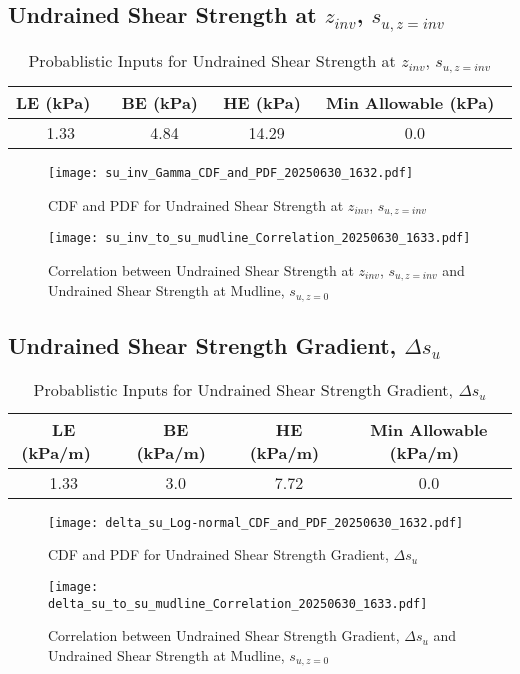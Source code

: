 \documentclass{article}
\begin{document}
\subsection*{Undrained Shear Strength at $z_{inv}$, $s_{{u,z=inv}}$}
\begin{table}[h!]
\centering
\caption{Probablistic Inputs for Undrained Shear Strength at $z_{inv}$, $s_{{u,z=inv}}$}
\begin{tabular}{|c|c|c|c|}
\hline
LE (kPa) \ & BE (kPa)\ & HE (kPa)\ & Min Allowable (kPa)\ \\
\hline
1.33 & 4.84 & 14.29 & 0.0 \\
\hline
\end{tabular}
\end{table}
\begin{figure}[h!]
\centering
\texttt{[image: su\_inv\_Gamma\_CDF\_and\_PDF\_20250630\_1632.pdf]}
\caption{CDF and PDF for Undrained Shear Strength at $z_{inv}$, $s_{{u,z=inv}}$}
\end{figure}
\begin{figure}[h!]
\centering
\texttt{[image: su\_inv\_to\_su\_mudline\_Correlation\_20250630\_1633.pdf]}
\caption{Correlation between Undrained Shear Strength at $z_{inv}$, $s_{{u,z=inv}}$ and Undrained Shear Strength at Mudline, $s_{{u,z=0}}$}
\end{figure}
\clearpage
\subsection*{Undrained Shear Strength Gradient, $\Delta s_{u}$}
\begin{table}[h!]
\centering
\caption{Probablistic Inputs for Undrained Shear Strength Gradient, $\Delta s_{u}$}
\begin{tabular}{|c|c|c|c|}
\hline
LE (kPa/m) \ & BE (kPa/m)\ & HE (kPa/m)\ & Min Allowable (kPa/m)\ \\
\hline
1.33 & 3.0 & 7.72 & 0.0 \\
\hline
\end{tabular}
\end{table}
\begin{figure}[h!]
\centering
\texttt{[image: delta\_su\_Log-normal\_CDF\_and\_PDF\_20250630\_1632.pdf]}
\caption{CDF and PDF for Undrained Shear Strength Gradient, $\Delta s_{u}$}
\end{figure}
\begin{figure}[h!]
\centering
\texttt{[image: delta\_su\_to\_su\_mudline\_Correlation\_20250630\_1633.pdf]}
\caption{Correlation between Undrained Shear Strength Gradient, $\Delta s_{u}$ and Undrained Shear Strength at Mudline, $s_{{u,z=0}}$}
\end{figure}
\clearpage
\end{document}
